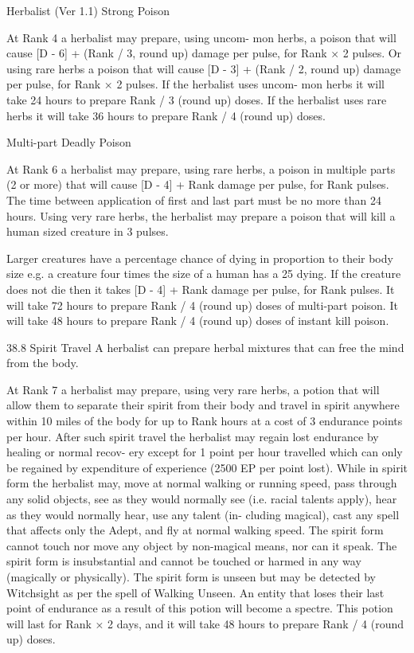 \begin{Chapter}{Herbalist (Ver 1.1)}
Strong Poison 

At  Rank  4  a  herbalist  may  prepare,  using  uncom-
mon herbs, a poison that will cause [D - 6] + (Rank 
/  3,  round  up)  damage  per  pulse,  for  Rank  ×  2 
pulses. Or using rare herbs a poison that will cause 
[D  -  3]  +  (Rank  /  2,  round  up)  damage  per  pulse, 
for  Rank  ×  2  pulses.  If  the  herbalist  uses  uncom-
mon herbs it will take 24 hours to prepare Rank / 3 
(round up) doses. If the herbalist uses rare herbs it 
will  take  36  hours  to  prepare  Rank  /  4  (round  up) 
doses. 

Multi-part Deadly Poison 

At  Rank  6  a  herbalist  may  prepare,  using  rare 
herbs,  a  poison  in  multiple  parts  (2  or  more)  that 
will  cause  [D  -  4]  +  Rank  damage  per  pulse,  for 
Rank pulses. The time between application of first 
and last part must be no more than 24 hours. Using 
very rare herbs, the herbalist may prepare a poison 
that will kill a human sized creature in 3 pulses. 

Larger creatures have a percentage chance of dying 
in proportion to their body size e.g. a creature four 
times  the  size  of  a  human  has  a  25%
dying. If the creature does not die then it takes [D - 
4]  +  Rank  damage  per  pulse,  for  Rank  pulses.  It 
will  take  72  hours  to  prepare  Rank  /  4  (round  up) 
doses of multi-part poison. It will take 48 hours to 
prepare  Rank  /  4  (round  up)  doses  of  instant  kill 
poison. 

38.8 Spirit Travel 
A  herbalist  can  prepare  herbal  mixtures  that  can 
free the mind from the body. 

At Rank 7 a herbalist may prepare, using very rare 
herbs,  a  potion  that  will  allow  them  to  separate 
their  spirit  from  their  body  and  travel  in  spirit 
anywhere  within  10  miles  of  the  body  for  up  to 
Rank  hours  at  a  cost  of  3  endurance  points  per 
hour.  After  such  spirit  travel  the  herbalist  may 
regain  lost  endurance  by  healing  or  normal  recov-
ery except for 1 point per hour travelled which can 
only  be  regained  by  expenditure  of  experience 
(2500  EP  per  point  lost).  While  in  spirit  form  the 
herbalist may, move at normal walking or running 
speed,  pass  through  any  solid  objects,  see  as  they 
would  normally  see  (i.e.  racial  talents  apply),  hear 
as  they  would  normally  hear,  use  any  talent  (in-
cluding  magical),  cast  any  spell  that  affects  only 
the  Adept,  and  fly  at  normal  walking  speed.  The 
spirit  form  cannot  touch  nor  move  any  object  by 
non-magical  means,  nor  can  it  speak.  The  spirit 
form  is  insubstantial  and  cannot  be  touched  or 
harmed  in  any  way  (magically  or  physically).  The 
spirit  form  is  unseen  but  may  be  detected  by 
Witchsight as per the spell of Walking Unseen. An 
entity  that  loses  their  last  point  of  endurance  as  a 
result  of  this  potion  will  become  a  spectre.  This 
potion will last for Rank × 2 days, and it will take 
48 hours to prepare Rank / 4 (round up) doses. 

\end{Chapter}
